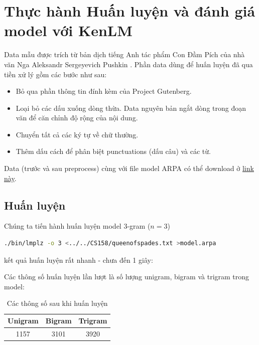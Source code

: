 \documentclass[12pt]{article}
\begin{document}
\section{Thực hành Huấn luyện và đánh giá model với KenLM}
Data mẫu được trích từ bản dịch tiếng Anh tác phẩm Con Đầm Pích của nhà văn Nga Aleksandr Sergeyevich Pushkin \cite{queen-of-spades}. Phần data dùng để huấn luyện đã qua tiền xử lý gồm các bước như sau:
\begin{itemize}
\item Bỏ qua phần thông tin đính kèm của Project Gutenberg.
\item Loại bỏ các dấu xuống dòng thừa. Data nguyên bản ngắt dòng trong đoạn văn để căn chỉnh độ rộng của nội dung.
\item Chuyển tất cả các ký tự về chữ thường.
\item Thêm dấu cách để phân biệt punctuations (dấu câu) và các từ.
\end{itemize}
Data (trước và sau preprocess) cùng với file model ARPA có thể download ở \href{https://studenthcmusedu-my.sharepoint.com/:f:/g/personal/19120338_student_hcmus_edu_vn/EqFiWm6iywdKms6WFubsNOYBOzqfFttfH8P81jBT8gcZIw?e=truaMM}{link này}\label{download-model}.

\subsection{Huấn luyện}
Chúng ta tiến hành huấn luyện model 3-gram ($n = 3$)
\begin{lstlisting}[language=sh]
./bin/lmplz -o 3 <../../CS158/queenofspades.txt >model.arpa
\end{lstlisting}
kết quả huấn luyện rất nhanh - chưa đến 1 giây:
\begin{figure}[H]
\end{figure}
\noindent Các thông số huấn luyện lần lượt là số lượng unigram, bigram và trigram trong model:
\begin{table}[H]
\centering
\begin{tabular}{|c|c|c|}
    \hline
    Unigram & Bigram & Trigram \\
    \hline
    1157 & 3101 & 3920 \\
    \hline
\end{tabular}
\caption{Các thông số sau khi huấn luyện}
\end{table}
\end{document}
